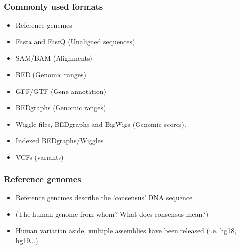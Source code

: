 \documentclass{beamer}
\begin{document}


\begin{frame}
  \frametitle{Commonly used formats}
  \begin{itemize}

  \item  Reference genomes

  \item  Fasta and FastQ (Unaligned sequences)
 
  \item SAM/BAM (Alignments)
 
  \item BED (Genomic ranges)
 
  \item GFF/GTF (Gene annotation)
 
  \item BEDgraphs (Genomic ranges)
 
  \item Wiggle files, BEDgraphs and BigWigs (Genomic scores).
 
  \item Indexed BEDgraphs/Wiggles

  \item VCFs (variants)

  \end{itemize}
\end{frame}



\begin{frame}
  \frametitle{Reference genomes}
  \begin{itemize}
  \item Reference genomes describe the 'consensus' DNA sequence 
  \item (The human genome from whom? What does consensus mean?)
  \item Human variation aside, multiple assemblies have been released (i.e. hg18, hg19...)
  \end{itemize}
\end{frame}
\end{document}
